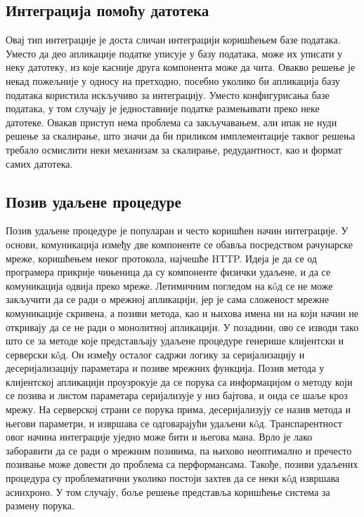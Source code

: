 \documentclass[12pt,oneside]{memoir}
\begin{document}
\subsection{Интеграција помоћу датотека}
Овај тип интеграције је доста сличан интеграцији коришћењем базе података. Уместо да део апликације податке уписује у базу података, може их уписати у неку датотеку, из које касније друга компонента може да чита. Овакво решење је некад пожељније у односу на претходно, посебно уколико би апликација базу података користила искључиво за интеграцију. Уместо конфигурисања базе података, у том случају је једноставније податке размењивати преко неке датотеке. Овакав приступ нема проблема са закључавањем, али ипак не нуди решење за скалирање, што значи да би приликом имплементације таквог решења требало осмислити неки механизам за скалирање, редудантност, као и формат самих датотека.

\subsection{Позив удаљене процедуре}
Позив удаљене процедуре је популаран и често коришћен начин интеграције. У основи, комуникација између две компоненте се обавља посредством рачунарске мреже, коришћењем неког протокола, најчешће HTTP. Идеја је да се од програмера прикрије чињеница да су компоненте физички удаљене, и да се комуникација одвија преко мреже. Летимичним погледом на кôд се не може закључити да се ради о мрежној апликацији, јер је сама сложеност мрежне комуникације скривена, а позиви метода, као и њихова имена ни на који начин не откривају да се не ради о монолитној апликацији. У позадини, ово се изводи тако што се за методе које представљају удаљене процедуре генерише клијентски и серверски кôд. Он између осталог садржи логику за серијализацију и десеријализацију параметара и позиве мрежних функција. Позив метода у клијентској апликацији проузрокује да се порука са информацијом о методу који се позива и листом параметара серијализује у низ бајтова, и онда се шаље кроз мрежу. На серверској страни се порука прима, десеријализују се назив метода и његови параметри, и извршава се одговарајући удаљени кôд. Транспарентност овог начина интеграције уједно може бити и његова мана. Врло је лако заборавити да се ради о мрежним позивима, па њихово неоптимално и пречесто позивање може довести до проблема са перформансама. Такође, позиви удаљених процедура су проблематични уколико постоји захтев да се неки кôд извршава асинхроно. У том случају, боље решење представља коришћење система за размену порука.
\end{document}
